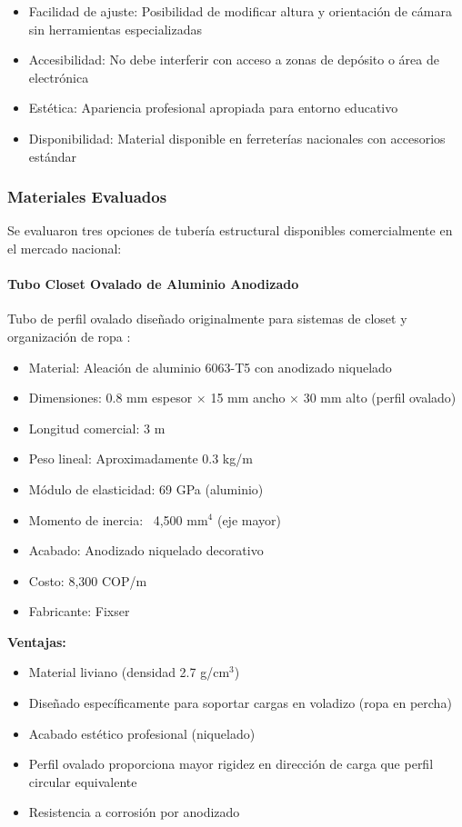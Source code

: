 \begin{itemize}
    \item Facilidad de ajuste: Posibilidad de modificar altura y orientación de cámara sin herramientas especializadas
    \item Accesibilidad: No debe interferir con acceso a zonas de depósito o área de electrónica
    \item Estética: Apariencia profesional apropiada para entorno educativo
    \item Disponibilidad: Material disponible en ferreterías nacionales con accesorios estándar
\end{itemize}

\subsubsection{Materiales Evaluados}

Se evaluaron tres opciones de tubería estructural disponibles comercialmente en el mercado nacional:

\paragraph{Tubo Closet Ovalado de Aluminio Anodizado}

Tubo de perfil ovalado diseñado originalmente para sistemas de closet y organización de ropa \cite{Fixser2024Closet}:

\begin{itemize}
    \item Material: Aleación de aluminio 6063-T5 con anodizado niquelado
    \item Dimensiones: 0.8 mm espesor × 15 mm ancho × 30 mm alto (perfil ovalado)
    \item Longitud comercial: 3 m
    \item Peso lineal: Aproximadamente 0.3 kg/m
    \item Módulo de elasticidad: 69 GPa (aluminio)
    \item Momento de inercia: ~4,500 mm$^4$ (eje mayor)
    \item Acabado: Anodizado niquelado decorativo
    \item Costo: 8,300 COP/m
    \item Fabricante: Fixser
\end{itemize}

\textbf{Ventajas:}
\begin{itemize}
    \item Material liviano (densidad 2.7 g/cm$^3$)
    \item Diseñado específicamente para soportar cargas en voladizo (ropa en percha)
    \item Acabado estético profesional (niquelado)
    \item Perfil ovalado proporciona mayor rigidez en dirección de carga que perfil circular equivalente
    \item Resistencia a corrosión por anodizado
\end{itemize}


